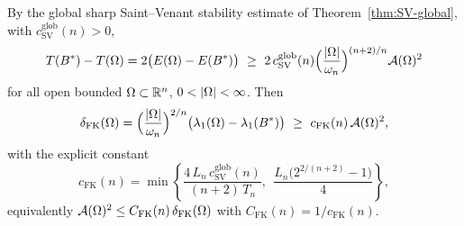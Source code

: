 \begin{theorem}\label{thm:fk}
By the global sharp Saint--Venant stability estimate of
Theorem~\ref{thm:SV-global}, with $c_{\mathrm{SV}}^{\mathrm{glob}}(n)>0$,
\begin{equation}\label{eq:sv-input}
  T(B^*)-T(\Omega)=2\bigl(E(\Omega)-E(B^*)\bigr)
  \ \ge\ 2\,c_{\mathrm{SV}}^{\mathrm{glob}}(n)
  \Bigl(\frac{\left|\Omega\right|}{\omega_n}\Bigr)^{(n+2)/n}\mathcal A(\Omega)^2
\end{equation}
for all open bounded $\Omega\subset\mathbb R^n$, $0<\left|\Omega\right|<\infty$. Then
\begin{equation}\label{eq:fk-out}
  \delta_{\mathrm{FK}}(\Omega)
  =\Bigl(\frac{\left|\Omega\right|}{\omega_n}\Bigr)^{2/n}
   \bigl(\lambda_1(\Omega)-\lambda_1(B^*)\bigr)
  \ \ge\ c_{\mathrm{FK}}(n)\,\mathcal A(\Omega)^2,
\end{equation}
with the explicit constant
\begin{equation}\label{eq:cfk}
  c_{\mathrm{FK}}(n)=\min\!\left\{
  \frac{4\,L_n\,c_{\mathrm{SV}}^{\mathrm{glob}}(n)}{(n+2)\,T_n},\ \
  \frac{L_n\bigl(2^{2/(n+2)}-1\bigr)}{4}\right\},
\end{equation}
equivalently $\mathcal A(\Omega)^2\le C_{\mathrm{FK}}(n)\,\delta_{\mathrm{FK}}(\Omega)$
with $C_{\mathrm{FK}}(n)=1/c_{\mathrm{FK}}(n)$.
\end{theorem}

